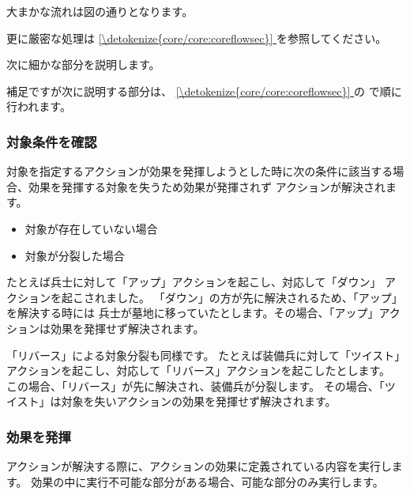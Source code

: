 \documentclass[letterpaper,10pt,dvipdfmx]{sphinxmanual}
\begin{document}
\sphinxAtStartPar
大まかな流れは図の通りとなります。

\sphinxAtStartPar
更に厳密な処理は \hyperref[\detokenize{core/core:coreflowsec}]{\ref{\detokenize{core/core:coreflowsec}} } を参照してください。

\sphinxAtStartPar
次に細かな部分を説明します。

\sphinxAtStartPar
補足ですが次に説明する部分は、 \hyperref[\detokenize{core/core:coreflowsec}]{\ref{\detokenize{core/core:coreflowsec}} } の {\hyperref[\detokenize{core/core:actresolve}]{}} で順に行われます。


\subsubsection{対象条件を確認}
\label{\detokenize{common/common:id29}}
\sphinxAtStartPar
対象を指定するアクションが効果を発揮しようとした時に次の条件に該当する場合、効果を発揮する対象を失うため効果が発揮されず
アクションが解決されます。
\begin{itemize}
\item {} 
\sphinxAtStartPar
対象が存在していない場合

\item {} 
\sphinxAtStartPar
対象が分裂した場合

\end{itemize}

\sphinxAtStartPar
たとえば兵士に対して「アップ」アクションを起こし、対応して「ダウン」
アクションを起こされました。
「ダウン」の方が先に解決されるため、「アップ」を解決する時には
兵士が墓地に移っていたとします。その場合、「アップ」アクションは効果を発揮せず解決されます。

\sphinxAtStartPar
「リバース」による対象分裂も同様です。
たとえば装備兵に対して「ツイスト」アクションを起こし、対応して「リバース」アクションを起こしたとします。
この場合、「リバース」が先に解決され、装備兵が分裂します。
その場合、「ツイスト」は対象を失いアクションの効果を発揮せず解決されます。


\subsubsection{効果を発揮}
\label{\detokenize{common/common:id30}}
\sphinxAtStartPar
アクションが解決する際に、アクションの効果に定義されている内容を実行します。
効果の中に実行不可能な部分がある場合、可能な部分のみ実行します。
\end{document}
